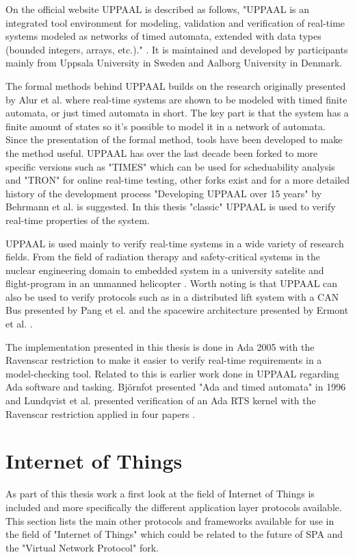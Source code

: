 On the official website UPPAAL is described as follows, "UPPAAL is an
integrated tool environment for modeling, validation and verification of
real-time systems modeled as networks of timed automata, extended with data
types (bounded integers, arrays, etc.)." \cite{web:uppaal}. It is maintained
and developed by participants mainly from Uppsala University in Sweden and
Aalborg University in Denmark.

The formal methods behind UPPAAL builds on the research originally presented
by Alur et al. \cite{alur1994} where real-time systems are shown to be modeled
with timed finite automata, or just timed automata in short. The key part is
that the system has a finite amount of states so it's possible to model it in a
network of automata. Since the presentation of the formal method, tools have
been developed to make the method useful. UPPAAL has over the last decade been
forked to more specific versions such as "TIMES" which can be used for
scheduability analysis and "TRON" for online real-time testing, other forks
exist and for a more detailed history of the development process "Developing
UPPAAL over 15 years" by Behrmann et al.  \cite{behrmann2011} is suggested. In
this thesis "classic" UPPAAL is used to verify real-time properties of the
system.

UPPAAL is used mainly to verify real-time systems in a wide variety of research
fields. From the field of radiation therapy \cite{man2011} and safety-critical
systems in the nuclear engineering domain \cite{lahtinen2012} to embedded
system in a university satelite \cite{alencar2013} and flight-program in an
unmanned helicopter \cite{lee2011}. Worth noting is that UPPAAL can also be used
to verify protocols such as in a distributed lift system with a CAN Bus
presented by Pang et el. \cite{pang2003} and the spacewire architecture
presented by Ermont et al. \cite{ermont2013}.

The implementation presented in this thesis is done in Ada 2005 with the
Ravenscar restriction to make it easier to verify real-time requirements in a
model-checking tool. Related to this is earlier work done in UPPAAL regarding
Ada software and tasking. Bj\"{o}rnfot presented "Ada and timed automata" in
1996 \cite{bjornfot1996} and Lundqvist et al. presented verification of an Ada
RTS kernel with the Ravenscar restriction applied in four papers
\cite{lundqvist1999f,lundqvist1999g,lundqvist1999h,lundqvist2003}.

\section{Internet of Things} \label{sec:sota:internet_of_things}
As part of this thesis work a first look at the field of Internet of Things is
included and more specifically the different application layer protocols
available. This section lists the main other protocols and frameworks available
for use in the field of "Internet of Things" which could be related to the
future of SPA and the "Virtual Network Protocol" fork.

